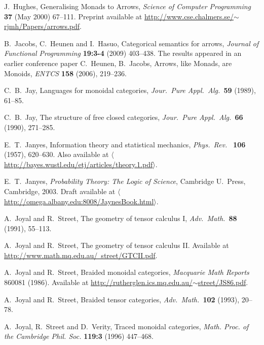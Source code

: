 \documentclass[12pt,twoside,openright]{report}
\begin{document}
\begin{thebibliography}{99}
 J.\ Hughes, Generalising Monads to Arrows, \emph{Science of Computer Programming} \textbf{37} (May 2000) 67--111.  Preprint available at \href{http://www.cse.chalmers.se/~rjmh/Papers/arrows.pdf}{http://www.cse.chalmers.se/$\sim$rjmh/Papers/arrows.pdf}.

 B.\ Jacobs, C.\ Heunen and I.\ Hasuo, Categorical semantics for arrows, {\sl Journal of Functional Programming} 
\textbf{19:3-4} (2009) 403--438.  The results appeared in an earlier conference paper C.\ Heunen, B.\ Jacobs, Arrows, like Monads, are Monoids, {\sl ENTCS} \textbf{158} (2006), 219--236.

C.\ B.\ Jay, Languages for monoidal categories, 
{\sl Jour.\ Pure Appl.\ Alg.\ }{\bf 59} (1989), 61--85.

C.\ B.\ Jay, The structure of free closed categories, 
{\sl Jour.\ Pure Appl.\ Alg.\ }{\bf 66} (1990), 271--285. 

 E.\ T.\ Janyes, Information theory and statistical mechanics, \textit{Phys.\ Rev.\ } 
\textbf{106} (1957), 620--630.  Also available at  \hfill \break
\href{http://bayes.wustl.edu/etj/articles/theory.1.pdf}
{$\langle$http://bayes.wustl.edu/etj/articles/theory.1.pdf$\rangle$}.

 E.\ T.\ Janyes, 
{\sl Probability Theory: The Logic of Science}, Cambridge U.\ Press, Cambridge, 2003. Draft available at \hfill \break
 \href{http://omega.albany.edu:8008/JaynesBook.html}
{$\langle$http://omega.albany.edu:8008/JaynesBook.html$\rangle$}.

A.\ Joyal and R.\ Street, The geometry of tensor calculus I, 
{\sl Adv.\ Math.\ }{\bf 88} (1991), 55--113.

A.\ Joyal and R.\ Street, The geometry of tensor calculus II. Available at
\hfill \break
\href{http://www.math.mq.edu.au/~street/GTCII.pdf}
{http://www.math.mq.edu.au/~street/GTCII.pdf}.

 A.\ Joyal and R.\ Street, Braided monoidal categories,
{\sl Macquarie Math Reports} 860081 (1986).  Available at
\href{http://rutherglen.ics.mq.edu.au/~street/JS86.pdf}{
http://rutherglen.ics.mq.edu.au/$\sim$street/JS86.pdf}.

A.\ Joyal and R.\ Street, Braided tensor categories,
\textsl{Adv.\ Math.\ }\textbf{102} (1993), 20--78.

 A.\ Joyal, R.\ Street and D.\ Verity, Traced monoidal categories, \textsl{Math. Proc. of the Cambridge Phil. Soc.} \textbf{119:3} (1996) 447--468.


\end{thebibliography}
\end{document}
